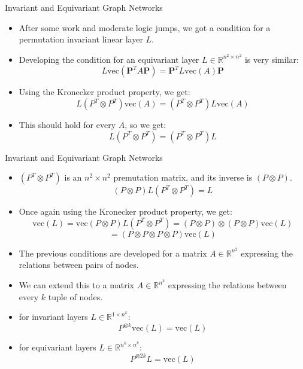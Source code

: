 \documentclass{beamer}
\begin{document}
\begin{frame}{Invariant and Equivariant Graph Networks}
    \begin{itemize}
        \setlength{\itemsep}{\fill}
        \item After some work and moderate logic jumps, we got a condition for a permutation invariant linear layer $L$.
        \item Developing the condition for an equivariant layer $L \in \mathbb{R}^{n^2 \times n^2}$ is very similar:
        \[ L\text{vec}(\boldsymbol{P}^T A\boldsymbol{P}) =\boldsymbol{P}^T L\text{vec}(A) \boldsymbol{P}\]
        \item Using the Kronecker product property, we get:
        \[ L(P^T\otimes P^T)\text{vec}(A) = (P^T\otimes P^T)L\text{vec}(A) \]
        \item This should hold for every $A$, so we get:
        \[ L(P^T\otimes P^T) = (P^T\otimes P^T)L \]
    \end{itemize}
\end{frame}
\begin{frame}{Invariant and Equivariant Graph Networks}
    \begin{itemize}
        \setlength{\itemsep}{\fill}
        \item $(P^T\otimes P^T)$ is an $n^2 \times n^2$ premutation matrix, and its inverse is $(P\otimes P)$.
        \[ (P\otimes P)L(P^T\otimes P^T) = L \]
        \item Once again using the Kronecker product property, we get:
        \[ \text{vec}(L) = \text{vec}(P\otimes P)L(P^T\otimes P^T) = (P\otimes P) \otimes (P \otimes P) \text{vec}(L) \]
        \[ = (P \otimes P \otimes P \otimes P) \text{vec}(L) \]
        \item The previous conditions are developed for a matrix $A \in \mathbb{R}^{n^2}$ expressing the relations between pairs of nodes.
        \item We can extend this to a matrix $A \in \mathbb{R}^{n^k}$ expressing the relations between every $k$ tuple of nodes.
        \item for invariant layers $L \in \mathbb{R}^{1 \times n^k}$:
        \[ P^{\otimes k}\text{vec}(L) = \text{vec}(L) \]
        \item for equivariant layers $L \in \mathbb{R}^{n^k \times n^k}$:
        \[ P^{\otimes 2k}L = \text{vec}(L) \]
    \end{itemize}
\end{frame}
\end{document}
